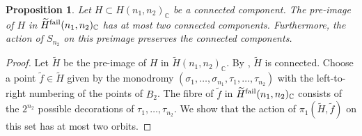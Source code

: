 \documentclass{amsart}
\numberwithin{equation}{section} \numberwithin{figure}{section}
\newcommand\CC{\mathbb{C}}
\theoremstyle{one}
\newtheorem{proposition}[theorem]{\textbf{Proposition}}
\theoremstyle{definition}
\begin{document}
\begin{proposition}\label{prop:comp-Hfailtilde}
  Let \(H \subset H(n_1,n_2)_{\CC}\) be a connected component.
  The pre-image of \(H\) in \(\widetilde H^{\rm fail}(n_1,n_2)_{\CC}\) has at most two connected components.
   Furthermore, the action of \(S_{n_2}\) on this preimage preserves the connected components. 
 \end{proposition}
\begin{proof}
  Let \(\widetilde H\) be the pre-image of \(H\) in \(\widetilde H(n_1,n_2)_{\CC}\).
  By , \(\widetilde H\) is connected.
  Choose a point \(\widetilde f \in \widetilde{H}\) given by the monodromy \((\sigma_1,\dots, \sigma_{n_1}, \tau_1, \dots, \tau_{n_2})\) with the left-to-right numbering of the points of \(B_2\). 
  The fibre of \(\widetilde f\) in \(\widetilde H^{\rm fail}(n_1,n_2)_{\CC}\) consists of the \(2^{n_2}\) possible decorations of \(\tau_1, \dots, \tau_{n_2}\).
  We show that the action of \(\pi_1(\widetilde H, \widetilde f)\) on this set has at most two orbits.


\end{proof}
\end{document}
